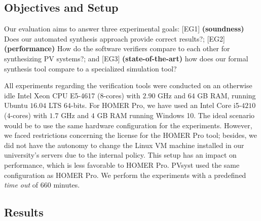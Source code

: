 \documentclass[runningheads]{llncs}
\begin{document}
\subsection{Objectives and Setup}

Our evaluation aims to answer three experimental goals: [EG1] \textbf{(soundness)} Does our automated synthesis approach provide correct results?; [EG2] \textbf{(performance)} How do the software verifiers compare to each other for synthesizing PV systems?; and [EG3] \textbf{(state-of-the-art)} how does our formal synthesis tool compare to a specialized simulation tool?

All experiments regarding the verification tools were conducted on an otherwise idle Intel Xeon CPU E5-4617 ($8$-cores) with $2.90$ GHz and $64$ GB RAM, running Ubuntu $16.04$ LTS $64$-bits. For HOMER Pro, we have used an Intel Core i5-$4210$ ($4$-cores) with $1.7$ GHz and $4$ GB RAM running Windows 10. The ideal scenario would be to use the same hardware configuration for the experiments. However, we faced restrictions concerning the license for the HOMER Pro tool; besides, we did not have the autonomy to change the Linux VM machine installed in our university's servers due to the internal policy. This setup has an impact on performance, which is less favorable to HOMER Pro. PVsyst used the same configuration as HOMER Pro. We perform the experiments with a predefined \textit{time out} of $660$ minutes.

\subsection{Results}
\end{document}
